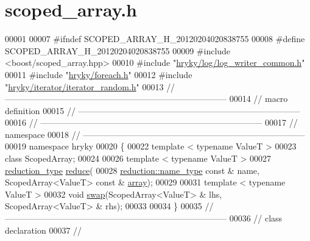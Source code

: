 \hypertarget{scoped__array_8h_source}{\section{scoped\-\_\-array.\-h}
}

\begin{DoxyCode}
00001 
00007 \textcolor{preprocessor}{#ifndef SCOPED\_ARRAY\_H\_20120204020838755}
00008 \textcolor{preprocessor}{}\textcolor{preprocessor}{#define SCOPED\_ARRAY\_H\_20120204020838755}
00009 \textcolor{preprocessor}{}\textcolor{preprocessor}{#include <boost/scoped\_array.hpp>}
00010 \textcolor{preprocessor}{#include "\hyperlink{log__writer__common_8h}{hryky/log/log_writer_common.h}"}
00011 \textcolor{preprocessor}{#include "\hyperlink{foreach_8h}{hryky/foreach.h}"}
00012 \textcolor{preprocessor}{#include "\hyperlink{iterator__random_8h}{hryky/iterator/iterator_random.h}"}
00013 \textcolor{comment}{//
      ------------------------------------------------------------------------------}
00014 \textcolor{comment}{// macro definition}
00015 \textcolor{comment}{//
      ------------------------------------------------------------------------------}
00016 \textcolor{comment}{//
      ------------------------------------------------------------------------------}
00017 \textcolor{comment}{// namespace}
00018 \textcolor{comment}{//
      ------------------------------------------------------------------------------}
00019 \textcolor{keyword}{namespace }hryky
00020 \{
00022     \textcolor{keyword}{template} < \textcolor{keyword}{typename} ValueT >
00023     \textcolor{keyword}{class }ScopedArray;
00024 
00026     \textcolor{keyword}{template} < \textcolor{keyword}{typename} ValueT >
00027     \hyperlink{namespacehryky_a343a9a4c36a586be5c2693156200eadc}{reduction_type} \hyperlink{namespacehryky_af41cb3af6766761da0ff21b84527a52c}{reduce}(
00028         \hyperlink{namespacehryky_1_1reduction_ac686c30a4c8d196bbd0f05629a6b921f}{reduction::name_type} \textcolor{keyword}{const} & name, ScopedArray<ValueT> \textcolor{keyword}{const} & \hyperlink{namespacehryky_1_1reduction_a9d45a4dc1ea9a6668ebd192f296f788c}{array});
00029 
00031     \textcolor{keyword}{template} < \textcolor{keyword}{typename} ValueT >
00032     \textcolor{keywordtype}{void} \hyperlink{namespacehryky_a4282146df5ea2b68cb667896a2205909}{swap}(ScopedArray<ValueT> & lhs, ScopedArray<ValueT> & rhs);
00033 
00034 \}
00035 \textcolor{comment}{//
      ------------------------------------------------------------------------------}
00036 \textcolor{comment}{// class declaration}
00037 \textcolor{comment}{//
}
\end{DoxyCode}
